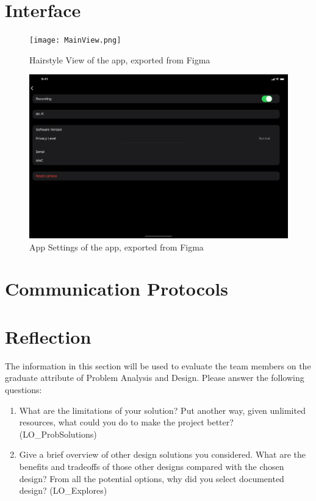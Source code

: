 \documentclass[12pt, titlepage]{article}
\begin{document}
% 

\newpage{}

\appendix

\section{Interface}

\begin{figure}[H]
  \centering
  \texttt{[image: MainView.png]}
  \caption{Hairstyle View of the app, exported from Figma}
\end{figure}

\begin{figure}[H]
  \centering
  \includegraphics[width=0.8\linewidth]{AppSettings.png}
  \caption{App Settings of the app, exported from Figma}
\end{figure}

\section{Communication Protocols}

\section{Reflection}

The information in this section will be used to evaluate the team members on the
graduate attribute of Problem Analysis and Design.  Please answer the following questions:

\begin{enumerate}
  \item What are the limitations of your solution?  Put another way, given
  unlimited resources, what could you do to make the project better? (LO\_ProbSolutions)
  \item Give a brief overview of other design solutions you considered.  What
  are the benefits and tradeoffs of those other designs compared with the chosen
  design?  From all the potential options, why did you select documented design?
  (LO\_Explores)
\end{enumerate}
\end{document}

